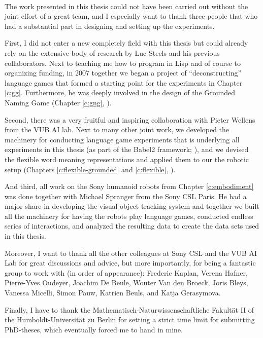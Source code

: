 ~\\

\noindent The work presented in this thesis could not have been
carried out without the joint effort of a great team, and I especially
want to thank three people that who had a substantial part in
designing and setting up the experiments.

First, I did not enter a new completely field with this thesis but
could already rely on the extensive body of research by Luc Steels and
his previous collaborators. Next to teaching me how to program in Lisp
and of course to organizing funding, in 2007 together we began a
project of ``deconstructing'' language games that formed a starting
point for the experiments in Chapter \ref{c:gg}. Furthermore, he was
deeply involved in the design of the Grounded Naming Game (Chapter
\ref{c:gng}, \citealp*{steels12grounded-naming-game}).


Second, there was a very fruitful and inspiring collaboration with
Pieter Wellens from the VUB AI lab. Next to many other joint work, we
developed the machinery for conducting language game experiments that
is underlying all experiments in this thesis (as part of the Babel2
framework; \citealp*{loetzsch08babel2,steels10babel}), and we devised
the flexible word meaning representations and applied them to our the
robotic setup (Chapters \ref{c:flexible-grounded} and
\ref{c:flexible},
\citealp*{wellens08flexible,wellens12multi-dimensional}).


And third, all work on the Sony humanoid robots from Chapter
\ref{c:embodiment} \citep*{spranger12perceptual} was done together
with Michael Spranger from the Sony CSL Paris. He had a major share in
developing the visual object tracking system and together we built all
the machinery for having the robots play language games, conducted
endless series of interactions, and analyzed the resulting data to
create the data sets used in this thesis.


Moreover, I want to thank all the other colleagues at Sony CSL and the
VUB AI Lab for great discussions and advice, but more importantly, for
being a fantastic group to work with (in order of appearance):
Frederic Kaplan, Verena Hafner, Pierre-Yves Oudeyer, Joachim De Beule,
Wouter Van den Broeck, Joris Bleys, Vanessa Micelli, Simon Pauw,
Katrien Beuls, and Katja Gerasymova.


Finally, I have to thank the Mathematisch-Naturwissenschaftliche
Fakultät II of the Humboldt-Universität zu Berlin for setting a strict
time limit for submitting PhD-theses, which eventually forced me to
hand in mine.





